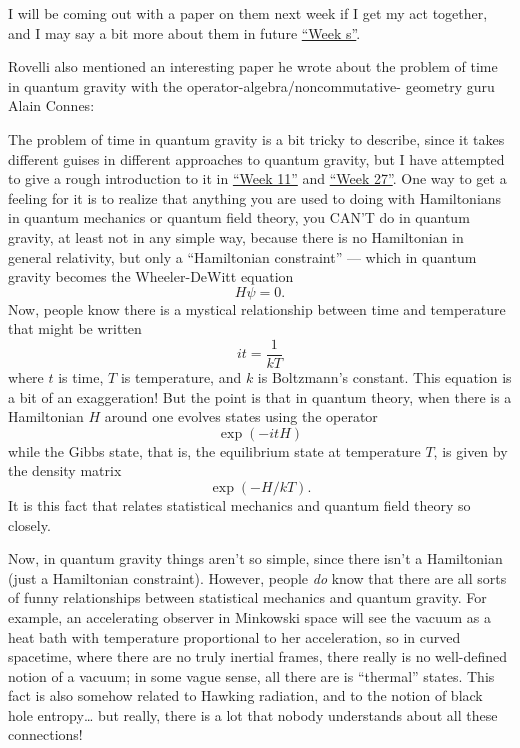 \documentclass{article}
\def\tightlist{}
\renewcommand{\texttt}[1]{%
  \begingroup
  \ttfamily
  \begingroup\lccode`~=`/\lowercase{\endgroup\def~}{/\discretionary{}{}{}}%
  \begingroup\lccode`~=`[\lowercase{\endgroup\def~}{[\discretionary{}{}{}}%
  \begingroup\lccode`~=`.\lowercase{\endgroup\def~}{.\discretionary{}{}{}}%
  \catcode`/=\active\catcode`[=\active\catcode`.=\active
  \scantokens{#1\noexpand}%
  \endgroup
}
\begin{document}
I will be coming out with a paper on them next week if I get my act
together, and I may say a bit more about them in future
\protect\hyperlink{weeks}{``Week s''}.

Rovelli also mentioned an interesting paper he wrote about the problem
of time in quantum gravity with the operator-algebra/noncommutative-
geometry guru Alain Connes:


The problem of time in quantum gravity is a bit tricky to describe,
since it takes different guises in different approaches to quantum
gravity, but I have attempted to give a rough introduction to it in
\protect\hyperlink{week11}{``Week 11''} and
\protect\hyperlink{week27}{``Week 27''}. One way to get a feeling for it
is to realize that anything you are used to doing with Hamiltonians in
quantum mechanics or quantum field theory, you CAN'T do in quantum
gravity, at least not in any simple way, because there is no Hamiltonian
in general relativity, but only a ``Hamiltonian constraint'' --- which
in quantum gravity becomes the Wheeler-DeWitt equation \[H \psi = 0.\]
Now, people know there is a mystical relationship between time and
temperature that might be written \[it = \frac{1}{kT}\] where \(t\) is
time, \(T\) is temperature, and \(k\) is Boltzmann's constant. This
equation is a bit of an exaggeration! But the point is that in quantum
theory, when there is a Hamiltonian \(H\) around one evolves states
using the operator \[\exp(-itH)\] while the Gibbs state, that is, the
equilibrium state at temperature \(T\), is given by the density matrix
\[\exp(-H/kT).\] It is this fact that relates statistical mechanics and
quantum field theory so closely.

Now, in quantum gravity things aren't so simple, since there isn't a
Hamiltonian (just a Hamiltonian constraint). However, people \emph{do}
know that there are all sorts of funny relationships between statistical
mechanics and quantum gravity. For example, an accelerating observer in
Minkowski space will see the vacuum as a heat bath with temperature
proportional to her acceleration, so in curved spacetime, where there
are no truly inertial frames, there really is no well-defined notion of
a vacuum; in some vague sense, all there are is ``thermal'' states. This
fact is also somehow related to Hawking radiation, and to the notion of
black hole entropy\ldots{} but really, there is a lot that nobody
understands about all these connections!
\end{document}
